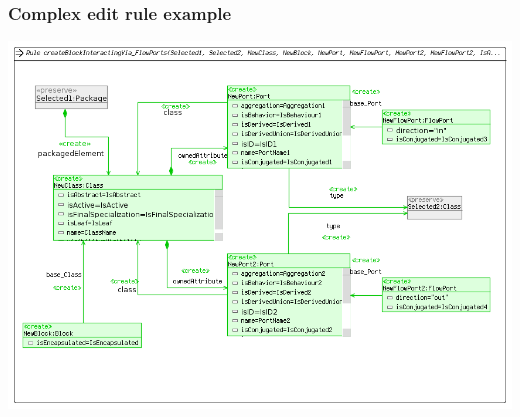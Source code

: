\documentclass[10pt]{beamer}
\begin{document}
\begin{frame}
\frametitle{Complex edit rule example}
\begin{center}
\includegraphics[scale=0.4]{CREATE_Block_Interacting_Via_FlowPorts}\\
\end{center}
\end{frame}
\end{document}
